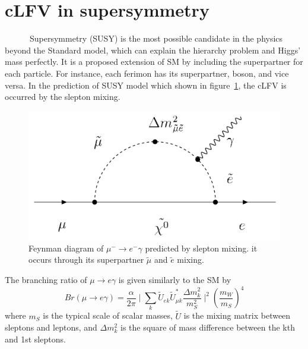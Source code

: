 \section{cLFV in supersymmetry}
~~~~~~Supersymmetry (SUSY) is the most possible candidate in the physics beyond the Standard model, which can explain the hierarchy problem and Higgs' mass perfectly.
It is a proposed extension of SM by including the superpartner for each particle.
For instance, each ferimon has its superpartner, boson, and vice versa.
In the prediction of SUSY model which shown in figure~\ref{susyfy}, the cLFV is occurred by the slepton mixing.
\begin{figure}[H]
 \centering
 \includegraphics[scale=0.3]{chapter1/fig/SUSYmue.pdf}
 \caption{Feynman diagram of $\mu^- \rightarrow e^-\gamma$ predicted by slepton mixing. it occurs through its superpartner $\tilde{\mu}$ and $\tilde{e}$ mixing.}
 \label{susyfy}
\end{figure}
The branching ratio of $\mu \rightarrow e\gamma$ is given similarly to the SM by~\cite{kuno2}
\begin{equation}
 Br(\mu \rightarrow e\gamma) = \frac{\alpha}{2\pi}\mid\sum_{k}\tilde{U}_{ek}\tilde{U}^*_{\mu k}\frac{\Delta m_k^2}{m_S^2}\mid^2(\frac{m_W}{m_S})^4
\end{equation}
where $m_S$ is the typical scale of scalar masses, $\tilde{U}$ is the mixing matrix between sleptons and leptons, and $\Delta m_k^2$ is the square of mass difference between the kth and 1st sleptons.

